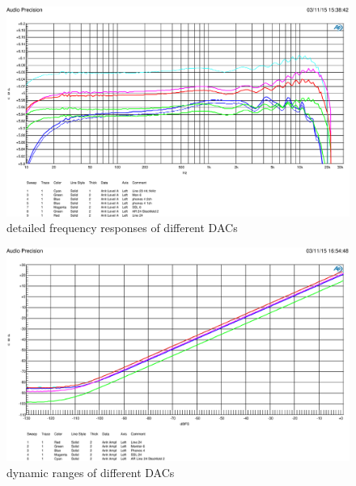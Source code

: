 \documentclass[11pt]{report}
\begin{document}
\begin{figure}[htbp]
\begin{center}
\includegraphics[width=14cm,keepaspectratio=true]{DaWandlerVergleich}
\caption{detailed frequency responses of different DACs}
\label{Abb.:1}
\end{center}
\end{figure}

\begin{figure}[htbp]
\begin{center}
\includegraphics[width=14cm,keepaspectratio=true]{Dynamikvergleich}
\caption{dynamic ranges of different DACs}
\label{Abb.:1}
\end{center}
\end{figure}
\end{document}
